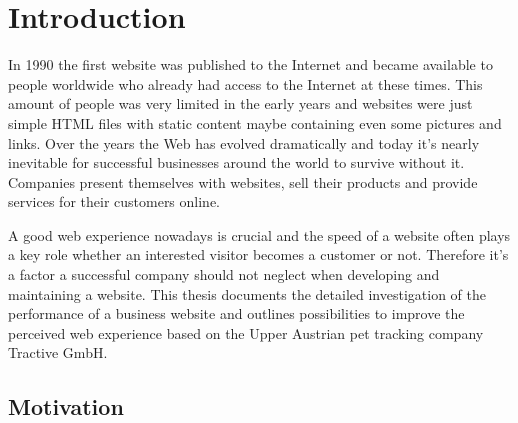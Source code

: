 \chapter{Introduction}
\label{sec:introduction}
In 1990 the first website was published to the Internet and became available to people worldwide who already had access to the Internet at these times. This amount of people was very limited in the early years and websites were just simple HTML files with static content maybe containing even some pictures and links. Over the years the Web has evolved dramatically and today it's nearly inevitable for successful businesses around the world to survive without it. Companies present themselves with websites, sell their products and provide services for their customers online. 

A good web experience nowadays is crucial and the speed of a website often plays a key role whether an interested visitor becomes a customer or not. Therefore it's a factor a successful company should not neglect when developing and maintaining a website. This thesis documents the detailed investigation of the performance of a business website and outlines possibilities to improve the perceived web experience based on the Upper Austrian pet tracking company Tractive GmbH.  

\section{Motivation}

